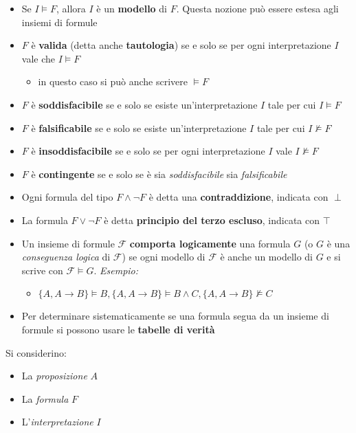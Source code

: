 \documentclass[italian, 10pt]{article}
\begin{document}
\begin{itemize}
  \item Se \(I \vDash F\), allora \(I\) è un \textbf{modello} di \(F\). Questa nozione può essere estesa agli insiemi di formule
  \item \(F\) è \textbf{valida} (detta anche \textbf{tautologia}) se e solo se per ogni interpretazione \(I\) vale che \(I \vDash F\)
        \begin{itemize}[label=\(\rightarrow\)]
          \item in questo caso si può anche scrivere \(\vDash F\)
        \end{itemize}
  \item \(F\) è \textbf{soddisfacibile} se e solo se esiste un'interpretazione \(I\) tale per cui \(I \vDash F\)
  \item \(F\) è \textbf{falsificabile} se e solo se esiste un'interpretazione \(I\) tale per cui \(I \nvDash F\)
  \item \(F\) è \textbf{insoddisfacibile} se e solo se per ogni interpretazione \(I\) vale  \(I \nvDash F\)
  \item \(F\) è \textbf{contingente} se e solo se è sia \textit{soddisfacibile} sia \textit{falsificabile}
  \item Ogni formula del tipo \(F \land \lnot F\) è detta una \textbf{contraddizione}, indicata con \(\perp\)
  \item La formula \(F \lor \lnot F\) è detta \textbf{principio del terzo escluso}, indicata con \(\top\)
  \item Un insieme di formule \(\mathcal{F}\) \textbf{comporta logicamente} una formula \(G\) (o \(G\) è una \textit{conseguenza logica} di \(\mathcal{F}\)) se ogni modello di \(\mathcal{F}\) è anche un modello di \(G\) e si scrive con \(\mathcal{F} \vDash G\). \textit{Esempio:}
        \begin{itemize}
          \item \(\{A, A \rightarrow B\} \vDash B, \{A, A\rightarrow B\} \vDash B \land C, \{A, A \rightarrow B\} \nvDash C \)
        \end{itemize}
  \item Per determinare sistematicamente se una formula segua da un insieme di formule si possono usare le \textbf{tabelle di verità}
\end{itemize}

\bigskip

Si considerino:

\begin{itemize}
  \item La \textit{proposizione} \(A\)
  \item La \textit{formula} \(F\)
  \item L'\textit{interpretazione} \(I\)
\end{itemize}
\end{document}
